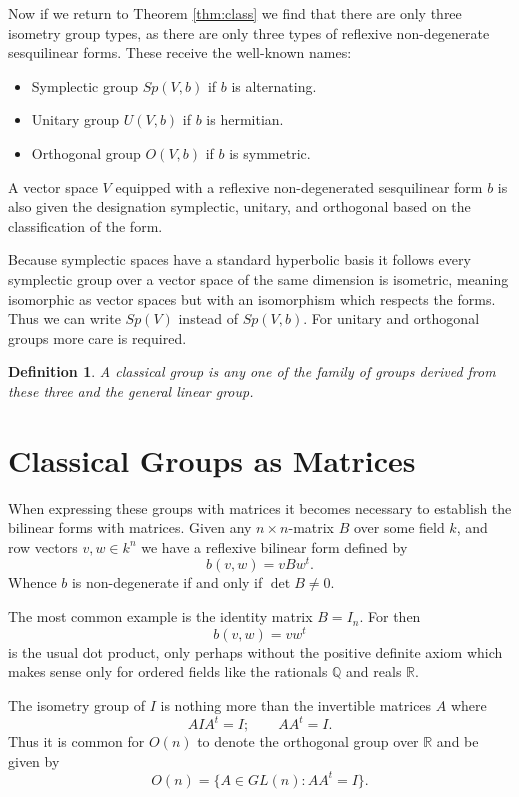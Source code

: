 \documentclass[12pt]{article}
\newtheorem{defn}[thm]{Definition}
\begin{document}
 Now if we return to Theorem \ref{thm:class} we find that there are only three isometry group types, as there are only three types of reflexive non-degenerate sesquilinear forms.  These receive the well-known names:
\begin{itemize}
\item Symplectic group $Sp(V, b)$ if $b$ is alternating.
\item Unitary group $U(V,b)$ if $b$ is hermitian.
\item Orthogonal group $O(V,b)$ if $b$ is symmetric.
\end{itemize}

A vector space $V$ equipped with a reflexive non-degenerated sesquilinear form $b$ is also given the designation symplectic, unitary, and orthogonal based on the classification of the form.

Because symplectic spaces have a standard hyperbolic basis it follows every symplectic group over a vector space of the same dimension is isometric, meaning isomorphic as vector spaces but with an isomorphism which respects the forms.  Thus we can write $Sp(V)$ instead of $Sp(V,b)$.  For unitary and orthogonal groups more care is required.

\begin{defn}
A \emph{classical group} is any one of the family of groups derived from these three and the general linear group.  
\end{defn}

\section{Classical Groups as Matrices}

When expressing these groups with matrices it becomes necessary to establish the bilinear forms with matrices.  Given any $n\times n$-matrix $B$ over some field $k$, and row vectors $v,w\in k^n$ we have a reflexive bilinear form defined by
\[ b(v,w)=vBw^t.\]
Whence $b$ is non-degenerate if and only if $\det B\neq 0$.

The most common example is the identity matrix $B=I_n$.  For then
\[b(v,w)=vw^t\]
is the usual dot product, only perhaps without the positive definite axiom which makes sense only for ordered fields like the rationals $\mathbb{Q}$ and reals 
$\mathbb{R}$.

The isometry group of $I$ is nothing more than the invertible matrices $A$ where
\[AIA^t=I;\qquad AA^t=I.\]
Thus it is common for $O(n)$ to denote the orthogonal group over $\mathbb{R}$ and be given by
\[ O(n)=\{A\in GL(n):AA^t=I\}.\]
\end{document}
